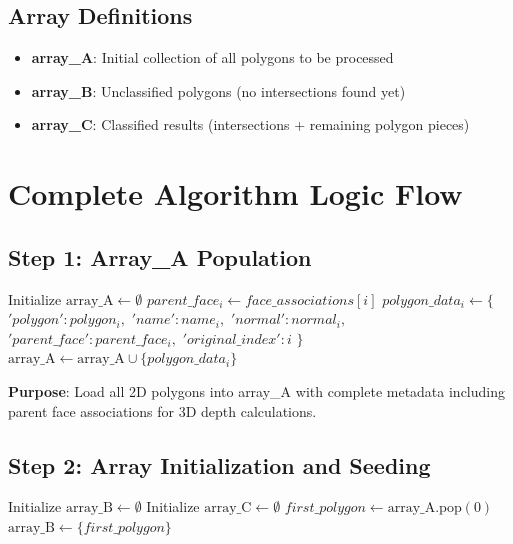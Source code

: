 \documentclass[12pt,a4paper]{article}
\begin{document}
\subsection{Array Definitions}
\begin{itemize}
    \item \textbf{array\_A}: Initial collection of all polygons to be processed
    \item \textbf{array\_B}: Unclassified polygons (no intersections found yet)
    \item \textbf{array\_C}: Classified results (intersections + remaining polygon pieces)
\end{itemize}

\section{Complete Algorithm Logic Flow}

\subsection{Step 1: Array\_A Population}

\begin{algorithm}
\caption{Array\_A Population}
\begin{algorithmic}[1]
\STATE Initialize $\text{array\_A} \leftarrow \emptyset$
    \STATE $parent\_face_i \leftarrow face\_associations[i]$
    \STATE $polygon\_data_i \leftarrow \{$
    \STATE \quad $'polygon': polygon_i,$
    \STATE \quad $'name': name_i,$
    \STATE \quad $'normal': normal_i,$
    \STATE \quad $'parent\_face': parent\_face_i,$
    \STATE \quad $'original\_index': i$
    \STATE $\}$
    \STATE $\text{array\_A} \leftarrow \text{array\_A} \cup \{polygon\_data_i\}$
\ENDFOR
\end{algorithmic}
\end{algorithm}

\textbf{Purpose}: Load all 2D polygons into array\_A with complete metadata including parent face associations for 3D depth calculations.

\subsection{Step 2: Array Initialization and Seeding}

\begin{algorithm}
\caption{Array Initialization}
\begin{algorithmic}[1]
\STATE Initialize $\text{array\_B} \leftarrow \emptyset$
\STATE Initialize $\text{array\_C} \leftarrow \emptyset$
    \STATE $first\_polygon \leftarrow \text{array\_A.pop}(0)$
    \STATE $\text{array\_B} \leftarrow \{first\_polygon\}$
\ENDIF
\end{algorithmic}
\end{algorithm}
\end{document}
